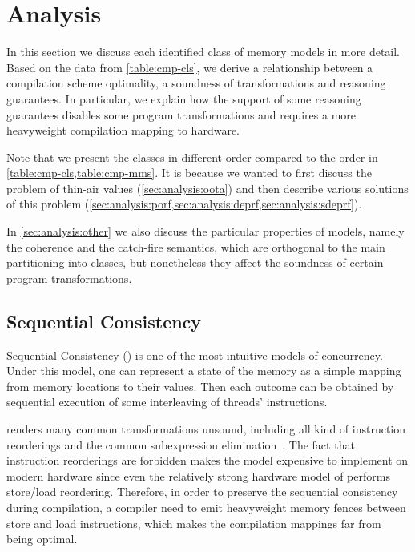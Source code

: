 \section{Analysis}
\label{sec:analysis}


In this section we discuss each identified class 
of memory models in more detail.
Based on the data from \cref{table:cmp-cls},
we derive a relationship between a compilation scheme optimality, 
a soundness of transformations and reasoning guarantees.
In particular, we explain how the support of some reasoning guarantees 
disables some program transformations and requires a more heavyweight 
compilation mapping to hardware.

Note that we present the classes in different order 
compared to the order in \cref{table:cmp-cls,table:cmp-mms}.
It is because we wanted to first discuss the problem 
of thin-air values (\cref{sec:analysis:oota}) and then describe 
various solutions of this problem
(\cref{sec:analysis:porf,sec:analysis:deprf,sec:analysis:sdeprf}).

In \cref{sec:analysis:other} we also discuss the particular properties 
of models, namely the coherence and the catch-fire semantics, 
which are orthogonal to the main partitioning into classes, 
but nonetheless they affect the soundness of 
certain program transformations.

\subsection{Sequential Consistency}
\label{sec:analysis:seqcst}

Sequential Consistency (\SC) is one of the most intuitive models of concurrency.
Under this model, one can represent a state of the memory as 
a simple mapping from memory locations to their values. 
Then each outcome can be obtained by 
sequential execution of some interleaving of threads' instructions.

\SC renders many common transformations unsound, 
including all kind of instruction reorderings and the
common subexpression elimination~\cite{Marino-al:PLDI11, Sevcik-Aspinall:ECOOP08}.
The fact that instruction reorderings are forbidden 
makes the model expensive to implement on modern hardware
since even the relatively strong hardware model of \Intel
performs store/load reordering.
Therefore, in order to preserve the sequential consistency during compilation,
a compiler need to emit heavyweight memory fences 
between store and load instructions,
which makes the compilation mappings far from being optimal.  

